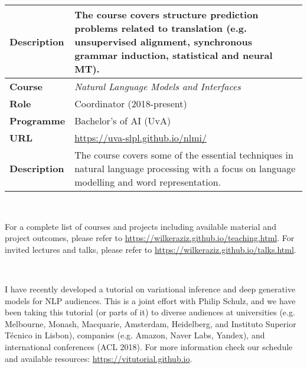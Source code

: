 \begin{center}
\begin{tabular}{l p{}}
{\bf Description} & The course covers structure prediction problems related to translation (e.g. unsupervised alignment, synchronous grammar induction, statistical and neural MT). 
\\ \hline
{\bf Course} & {\it Natural Language Models and Interfaces} \\
{\bf Role}   & Coordinator (2018-present) \\
{\bf Programme} & Bachelor's of AI (UvA)\\
{\bf URL} & \url{https://uva-slpl.github.io/nlmi/} \\
{\bf Description} & The course covers some of the essential techniques in natural language processing with a focus on language modelling and word representation.
\\ \hline
\end{tabular}
\end{center}

~

For a complete list of courses and projects including available material and project outcomes, please refer to \url{https://wilkeraziz.github.io/teaching.html}.
For invited lectures and talks, please refer to \url{https://wilkeraziz.github.io/talks.html}.

~


I have recently developed a tutorial on variational inference and deep generative models for NLP audiences. This is a joint effort with Philip Schulz, and we have been taking this tutorial (or parts of it) to diverse audiences at universities (e.g. Melbourne, Monash, Macquarie, Amsterdam, Heidelberg, and Instituto Superior T\'{e}cnico in Lisbon), companies (e.g. Amazon, Naver Labs, Yandex), and international conferences (ACL 2018). For more information check our schedule and available resources: \url{https://vitutorial.github.io}.




